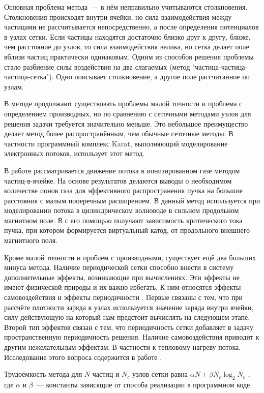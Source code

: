 \documentclass[a4paper,14pt]{extreport} %
\begin{document}
Основная проблема метода~--- в нём неправильно учитываются столкновения. Столкновения происходят внутри ячейки, но сила взаимодействия между частицами не рассчитывается непосредственно, а после определения потенциалов в узлах сетки. Если частицы находятся достаточно близко друг к другу, ближе, чем расстояние до узлов, то сила взаимодействия велика, но сетка делает поле вблизи частиц практически одинаковым. Одним из способов решения проблемы стало разбиение силы воздействия на два слагаемых (метод "частица-частица-частица-сетка"). Одно описывает столкновение, а другое поле рассчитанное по узлам.

В методе продолжают существовать проблемы малой точности и проблема с определением производных, но по сравнению с сеточными методами узлов для решения задачи требуется значительно меньше. Это небольшое преимущество делает метод более распространённым, чем обычные сеточные методы. В частности программный комплекс Karat, выполняющий моделирование электронных потоков, использует этот метод.

В работе \cite{IFR_PIC} рассматривается движение потока в ионизированном газе методом частиц-в-ячейке. На основе результатов делаются выводы о необходимом количестве ионов газа для эффективного распространения пучка на большие расстояния с малым поперечным расширением. В \cite{IZVPND}  данный метод используется при моделировании потока в цилиндрическом волноводе в сильном продольном магнитном поле. В \cite{VGTMorozov} с его помощью получают зависимость критического тока пучка, при котором формируется виртуальный катод, от продольного внешнего магнитного поля.

Кроме малой точности и проблем с производными, существует ещё два больших минуса метода. Наличие периодической сетки способно внести в систему дополнительные эффекты, возникающие при вычислениях. Эти эффекты не имеют физической природы и их важно избегать. К ним относятся эффекты самовоздействия  и эффекты периодичности \cite{Grigoriev}. Первые связаны с тем, что при рассчёте плотности заряда в узлах используется значение заряда внутри ячейки, силу действующую на который нам предстоит вычислять на следующем этапе. Второй тип эффектов связан с тем, что периодичность сетки добавляет в задачу пространственную периодичность решения. Наличие самовоздействия приводит к другим нежелательным эффектам. В частности к тепловому нагреву потока. Исследование этого вопроса содержится в работе \cite{GTFVshivkov}.

Трудоёмкость метода для $N$ частиц и $N_c$ узлов сетки равна $\alpha N+ \beta N_c \log_2 N_c $ \cite{Hokni}, где $\alpha$ и $\beta$~--- константы зависящие от способа реализации в программном коде.
\end{document}
